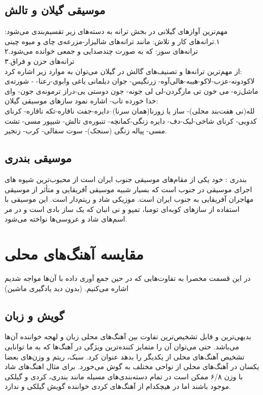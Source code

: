 \subsection{موسیقی گیلان و تالش}
مهم‌ترین آوازهای گیلانی در بخش ترانه به دسته‌های زیر تقسیم‌بندی می‌شود:
۱.ترانه‌های کار و تلاش: مانند ترانه‌های شالیزار-مزرعه‌ی چای و میوه چینی\\
۲.ترانه‌های سور: که به صورت چندصدایی و جمعی خوانده می‌شود\\
۳.ترانه‌های حزن و فراق\\
از مهم‌ترین ترانه‌ها و تصنیف‌های گالش در گیلان می‌توان به موارد زیر اشاره کرد:\\
لاکودونه-عزب-لاکو-هیبه-هالی‌آوه- زرنگیس- جوان دیلمانی یاغی وابوی-رعنا- - شورته‌ی ماشل‌زه- می خون تی مارگردن-لی لی جونه- جون دوستی یی-دراز ترمونه‌ی جون- وای خدا خورده تاب- اشاره نمود
 سازهای موسیقی گیلان:\\
 لله(نی هفت‌بند محلی)- ساز یا زورنا(همان سرنا)--دایره-جفت ناقاره-تکه ناقاره- کرنای کدویی- کرنای شاخی-لبک-دف- دایره زنگی-کمانچه- تنبوره‌ی تالش- شیپور مسی- تشت مسی- پیاله زنگی (سنجک)- سوت سفالی- کرب- زنجیر.\\
 \subsection{موسیقی بندری}
 بندری : خود یکی از مقام‌های موسیقی جنوب ایران است از محبوب‌ترین شیوه های اجرای موسیقی در جنوب است که بسیار شبیه موسیقی آفریقایی و متأثر از موسیقی مهاجران آفریقایی به جنوب ایران است. موزیکی شاد و ریتم‌دار است. این موسیقی با استفاده از ساز‌های کوبه‌ای تومبا، تمپو و نی انبان که یک ساز بادی است و در مر
 اسم‌های شاد و عروسی‌ها نواخته می‌شود.

 \section{مقایسه آهنگ‌های محلی}
در این قسمت مخصرا به تفاوت‌هایی که در حین جمع آوری داده با آن‌ها مواجه شدیم اشاره می‌کنیم. (بدون دید یادگیری ماشین)

\subsection{گویش و زبان}
بدیهی‌ترین و قابل تشخیص‌ترین تفاوت بین آهنگ‌های محلی زبان و لهجه خواننده آن‌ها می‌باشد. حتی می‌توان آن را متمایز کننده‌ترین ویژگی در آهنگ‌ها که به ما توانایی تشخیص آهنگ‌های محلی از یکدیگر را بدهد عنوان کرد. سبک، ریتم و وزن‌های بعضا یکسان در آهنگ‌های محلی از نواحی مختلف به گوش می‌خورد. برای مثال اهنگ‌های شاد با وزن ۶/۸ ممکن است در تمام دسته‌بندی‌های مسیله مانند بندری، کردی و گیلکی موجود باشند اما در هیچکدام از آهنگ‌های کردی خواننده گویش گیلکی و ندارد.
